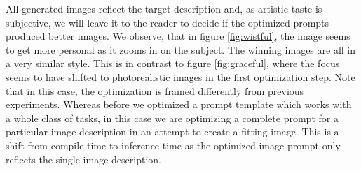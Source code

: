 All generated images reflect the target description and, as artistic taste is subjective, we will leave it to the reader 
to decide if the optimized prompts produced better images. We observe, that in figure \ref{fig:wistful}, the image seems to get more personal as it zooms in on the subject.
The winning images are all in a very similar style. This is in contrast to figure \ref{fig:graceful}, where the focus seems to have shifted to 
photorealistic images in the first optimization step.
\newpage
Note that in this case, the optimization is framed differently from previous experiments. 
Whereas before we optimized a prompt template which works with a whole class of tasks,
in this case we are optimizing a complete prompt for a particular image description in an attempt to
create a fitting image. This is a shift from compile-time to inference-time as the optimized image prompt only reflects the single image description. 

